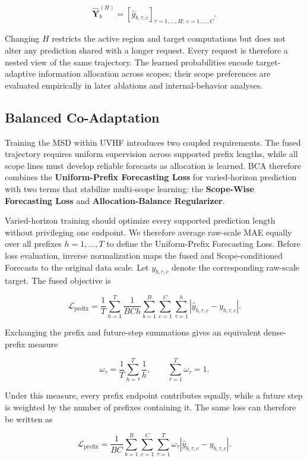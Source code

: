 \documentclass[final,3p,times]{elsarticle}
\newif\ifshowrevisions
\newcommand{\rev}[1]{\ifshowrevisions\textcolor{revisionblue}{#1}\else#1\fi}
\begin{document}
\[
\widehat{\mathbf Y}_b^{(H)}
=
\left[
\widehat y_{b,\tau,c}
\right]_{\tau=1,\ldots,H;\ c=1,\ldots,C}.
\]


Changing $H$ restricts the active region and target computations but does not alter any prediction shared with a longer request. Every request is therefore a nested view of the same trajectory. The learned probabilities encode target-adaptive information allocation across scopes; their scope preferences are evaluated empirically in later ablations and internal-behavior analyses.

\subsection{\rev{Balanced Co-Adaptation}}


\rev{Training the MSD within UVHF introduces two coupled requirements.} The fused trajectory requires uniform supervision across supported prefix lengths, while all scope lines must develop reliable forecasts as allocation is learned. \rev{BCA therefore combines the \textbf{Uniform-Prefix Forecasting Loss} for varied-horizon prediction with two terms that stabilize multi-scope learning: the \textbf{Scope-Wise Forecasting Loss} and \textbf{Allocation-Balance Regularizer}.}

Varied-horizon training should optimize every supported prediction length without privileging one endpoint. We therefore average raw-scale MAE equally over all prefixes $h=1,\ldots,T$ to define the Uniform-Prefix Forecasting Loss. Before loss evaluation, inverse normalization maps the fused and Scope-conditioned Forecasts to the original data scale. Let $y_{b,\tau,c}$ denote the corresponding raw-scale target. The fused objective is

\[
\mathcal L_{\mathrm{prefix}}
=
\frac{1}{T}
\sum_{h=1}^{T}
\frac{1}{BCh}
\sum_{b=1}^{B}
\sum_{c=1}^{C}
\sum_{\tau=1}^{h}
\left|
\widehat y_{b,\tau,c}-y_{b,\tau,c}
\right|.
\]


Exchanging the prefix and future-step summations gives an equivalent dense-prefix measure

\[
\omega_\tau
=
\frac{1}{T}
\sum_{h=\tau}^{T}
\frac{1}{h},
\qquad
\sum_{\tau=1}^{T}\omega_\tau=1.
\]


Under this measure, every prefix endpoint contributes equally, while a future step is weighted by the number of prefixes containing it. The same loss can therefore be written as

\[
\mathcal L_{\mathrm{prefix}}
=
\frac{1}{BC}
\sum_{b=1}^{B}
\sum_{c=1}^{C}
\sum_{\tau=1}^{T}
\omega_\tau
\left|
\widehat y_{b,\tau,c}-y_{b,\tau,c}
\right|.
\]
\end{document}
